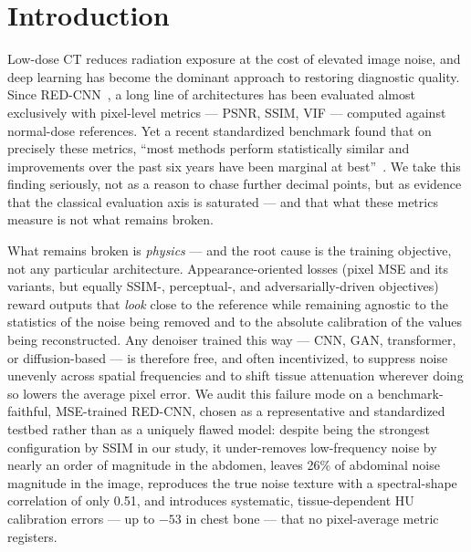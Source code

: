 \section{Introduction}
\label{sec:intro}

Low-dose CT reduces radiation exposure at the cost of elevated image noise, and deep learning has become the dominant approach to restoring diagnostic quality. Since RED-CNN~\cite{chen2017}, a long line of architectures has been evaluated almost exclusively with pixel-level metrics --- PSNR, SSIM, VIF --- computed against normal-dose references. Yet a recent standardized benchmark found that on precisely these metrics, ``most methods perform statistically similar and improvements over the past six years have been marginal at best''~\cite{eulig2024}. We take this finding seriously, not as a reason to chase further decimal points, but as evidence that the classical evaluation axis is saturated --- and that what these metrics measure is not what remains broken.

What remains broken is \emph{physics} --- and the root cause is the training objective, not any particular architecture. Appearance-oriented losses (pixel MSE and its variants, but equally SSIM-, perceptual-, and adversarially-driven objectives) reward outputs that \emph{look} close to the reference while remaining agnostic to the statistics of the noise being removed and to the absolute calibration of the values being reconstructed. Any denoiser trained this way --- CNN, GAN, transformer, or diffusion-based --- is therefore free, and often incentivized, to suppress noise unevenly across spatial frequencies and to shift tissue attenuation wherever doing so lowers the average pixel error. We audit this failure mode on a benchmark-faithful, MSE-trained RED-CNN, chosen as a representative and standardized testbed rather than as a uniquely flawed model: despite being the strongest configuration by SSIM in our study, it under-removes low-frequency noise by nearly an order of magnitude in the abdomen, leaves 26\% of abdominal noise magnitude in the image, reproduces the true noise texture with a spectral-shape correlation of only 0.51, and introduces systematic, tissue-dependent HU calibration errors --- up to $-53$\hu{} in chest bone --- that no pixel-average metric registers.

